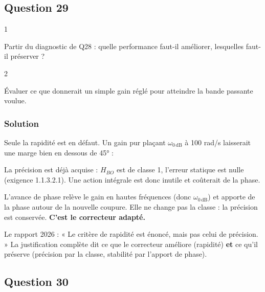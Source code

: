 \documentclass[11pt,a4paper]{article}
\newcommand{\equationajustee}[1]{%
  \sbox{\boiteequation}{$\displaystyle #1$}%
  \ifdim\wd\boiteequation>\linewidth
    \[\resizebox{\linewidth}{!}{\usebox{\boiteequation}}\]%
  \else
    \[#1\]%
  \fi}
\begin{document}
\hypertarget{question-29}{%
\subsection{Question 29}\label{question-29}}

\begin{indication}{1}

Partir du diagnostic de Q28 : quelle performance faut-il améliorer, lesquelles faut-il préserver ?

\end{indication}

\begin{indication}{2}

Évaluer ce que donnerait un simple gain réglé pour atteindre la bande passante voulue.

\end{indication}

\hypertarget{solution-28}{%
\subsubsection{Solution}\label{solution-28}}

Seule la rapidité est en défaut. Un gain pur plaçant \(\omega_{0\,\text{dB}}\) à 100 rad/s laisserait une marge bien en dessous de 45° :

\equationajustee{M_\varphi = 90° - \arctan 5 \approx 11°}

La précision est déjà acquise : \(H_{BO}\) est de classe 1, l'erreur statique est nulle (exigence 1.1.3.2.1). Une action intégrale est donc inutile et coûterait de la phase.

L'avance de phase relève le gain en hautes fréquences (donc \(\omega_{0\,\text{dB}}\)) et apporte de la phase autour de la nouvelle coupure. Elle ne change pas la classe : la précision est conservée. \textbf{C'est le correcteur adapté.}

\begin{jury}

Le rapport 2026 : « Le critère de rapidité est énoncé, mais pas celui de précision. » La justification complète dit ce que le correcteur améliore (rapidité) \textbf{et} ce qu'il préserve (précision par la classe, stabilité par l'apport de phase).

\end{jury}

\hypertarget{question-30}{%
\subsection{Question 30}\label{question-30}}
\end{document}
